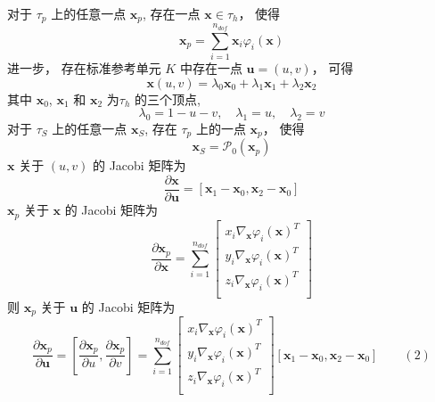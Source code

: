 \documentclass{article}
\begin{document}
对于 $\tau_p$ 上的任意一点 $\mathbf x_p$, 存在一点 $\mathbf x \in \tau_h$， 使得
\begin{equation*}
\mathbf x_p = \sum_{i=1}^{n_{dof}} \mathbf x_i \varphi_i(\mathbf x)
\end{equation*}
进一步， 存在标准参考单元 $K$ 中存在一点 $\mathbf u = (u,v)$， 可得
\begin{equation*}
\mathbf x(u,v) = \lambda_0 \mathbf x_0 + \lambda_1 \mathbf x_1 + \lambda_2 \mathbf x_2
\end{equation*}
其中 $\mathbf x_0$, $\mathbf x_1$ 和 $\mathbf x_2$ 为$\tau_h$ 的三个顶点, 
\begin{equation*}
\lambda_0 = 1- u - v,\quad\lambda_1 = u,\quad\lambda_2 = v
\end{equation*}
对于 $\tau_S$ 上的任意一点 $\mathbf x_S$, 存在 $\tau_p$ 上的一点 $\mathbf x_p$， 使得
\begin{equation*}
\mathbf x_S = \mathcal P_0(\mathbf x_p)
\end{equation*}
$\mathbf x$ 关于  $(u, v)$ 的 Jacobi 矩阵为
\begin{equation*}
\frac{\partial \mathbf x}{\partial \mathbf u} = [\mathbf x_1 - \mathbf x_0, \mathbf x_2 - \mathbf x_0]
\end{equation*}
$\mathbf x_p$ 关于 $\mathbf x$ 的 Jacobi 矩阵为
\begin{equation*}
\frac{\partial \mathbf x_p}{\partial \mathbf x} = \sum_{i=1}^{n_{dof}}
\begin{bmatrix}
x_i\nabla_{\mathbf x}\varphi_i(\mathbf x)^T\\
y_i\nabla_{\mathbf x}\varphi_i(\mathbf x)^T\\
z_i\nabla_{\mathbf x}\varphi_i(\mathbf x)^T\\
\end{bmatrix}
\end{equation*}
则 $\mathbf x_p$ 关于 $\mathbf u$ 的 Jacobi 矩阵为
\begin{equation*}
\frac{\partial \mathbf x_p}{\partial \mathbf u}=[\frac{\partial \mathbf x_p}{\partial u}, \frac{\partial \mathbf x_p}{\partial v}]=\sum_{i=1}^{n_{dof}}
\begin{bmatrix}
x_i\nabla_{\mathbf x}\varphi_i(\mathbf x)^T\\
y_i\nabla_{\mathbf x}\varphi_i(\mathbf x)^T\\
z_i\nabla_{\mathbf x}\varphi_i(\mathbf x)^T\\
\end{bmatrix}
[\mathbf x_1 - \mathbf x_0, \mathbf x_2 - \mathbf x_0]\qquad(2)
\end{equation*}
\end{document}
